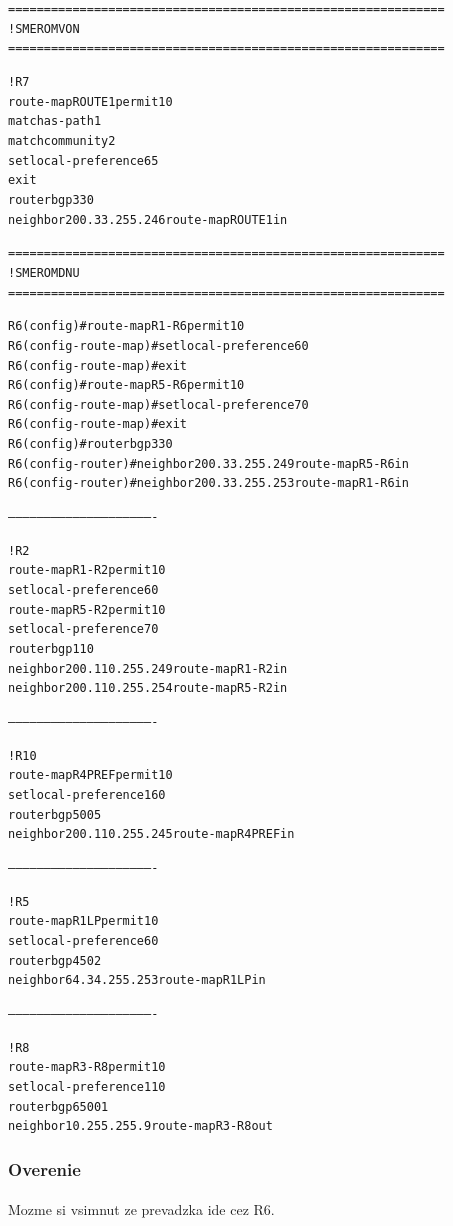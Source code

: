 \documentclass[12pt,twoside,a4paper]{report}
\begin{document}
\noindent
{\selectfont
\begin{small}
\begin{alltt}
=============================================================
!SMEROM VON
=============================================================

!R7
route-map ROUTE1 permit 10
  match as-path 1
  match community 2
  set local-preference 65
exit
router bgp 330
neighbor 200.33.255.246 route-map ROUTE1 in


=============================================================
!SMEROM DNU
=============================================================

R6(config)#route-map R1-R6 permit 10
R6(config-route-map)#set local-preference 60
R6(config-route-map)#exit
R6(config)#route-map R5-R6 permit 10
R6(config-route-map)#set local-preference 70
R6(config-route-map)#exit
R6(config)#router bgp 330
R6(config-router)#neighbor 200.33.255.249 route-map R5-R6 in
R6(config-router)#neighbor 200.33.255.253 route-map R1-R6 in


-------------------------------------------------------------


!R2
route-map R1-R2 permit 10
  set local-preference 60
route-map R5-R2 permit 10
  set local-preference 70
router bgp 110
  neighbor 200.110.255.249 route-map R1-R2 in
  neighbor 200.110.255.254 route-map R5-R2 in


-------------------------------------------------------------


!R10
route-map R4PREF permit 10
  set local-preference 160
router bgp 5005
  neighbor 200.110.255.245 route-map R4PREF in


-------------------------------------------------------------


!R5
route-map R1LP permit 10
  set local-preference 60
router bgp 4502
  neighbor 64.34.255.253 route-map R1LP in


-------------------------------------------------------------


!R8
route-map R3-R8 permit 10
  set local-preference 110
router bgp 65001
  neighbor 10.255.255.9 route-map R3-R8 out
\end{alltt}
\end{small}
}



\subsubsection{Overenie}
\paragraph{}
Mozme si vsimnut ze prevadzka ide cez R6.
\end{document}
